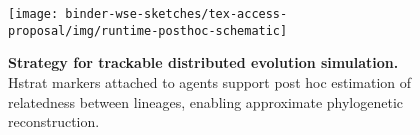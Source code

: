 \begin{figure}
  \vspace{2ex}
    \centering
  \texttt{[image: binder-wse-sketches/tex-access-proposal/img/runtime-posthoc-schematic]}
  \vspace{-1.5ex}
    \caption{\textbf{Strategy for trackable distributed evolution simulation.}
    \footnotesize %
    Hstrat markers attached to agents support post hoc estimation of relatedness between lineages, enabling approximate phylogenetic reconstruction.
    }
    \label{fig:runtime-posthoc-schematic}
\vspace{-0.2in}
\end{figure}
